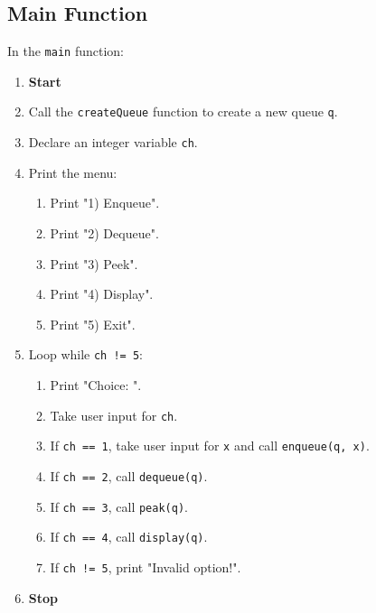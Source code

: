{  \subsection{Main Function}
  In the \texttt{main} function:
  \begin{enumerate}[label=\arabic*:, start=1]
    \item \textbf{Start}
    \item Call the \texttt{createQueue} function to create a new queue \texttt{q}.
    \item Declare an integer variable \texttt{ch}.
    \item Print the menu:
          \begin{enumerate}[label=3.\arabic*:, start=1]
            \item Print "1) Enqueue".
            \item Print "2) Dequeue".
            \item Print "3) Peek".
            \item Print "4) Display".
            \item Print "5) Exit".
          \end{enumerate}
    \item Loop while \texttt{ch != 5}:
          \begin{enumerate}[label=5.\arabic*:, start=1]
            \item Print "Choice: ".
            \item Take user input for \texttt{ch}.
            \item If \texttt{ch == 1}, take user input for \texttt{x} and call \texttt{enqueue(q, x)}.
            \item If \texttt{ch == 2}, call \texttt{dequeue(q)}.
            \item If \texttt{ch == 3}, call \texttt{peak(q)}.
            \item If \texttt{ch == 4}, call \texttt{display(q)}.
            \item If \texttt{ch != 5}, print "Invalid option!".
          \end{enumerate}
    \item \textbf{Stop}
  \end{enumerate}
 }

